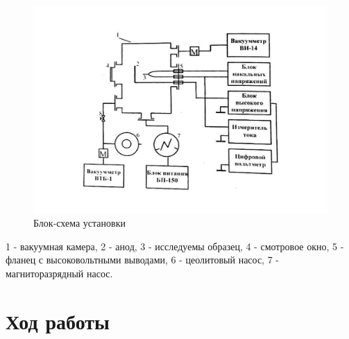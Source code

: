 \documentclass[a4paper]{article}
\begin{document}
\begin{figure}[H]
	\begin{center}
	\includegraphics[scale = 0.35]{p3.pdf}
	\caption{Блок-схема установки}
	\label{default}
	\end{center}
\end{figure}

1 - вакуумная камера, 2 - анод, 3 - исследуемы образец, 4 - смотровое окно, 5 - 
фланец с высоковольтными выводами, 6 - цеолитовый насос, 7 - магниторазрядный насос.

\section{Ход работы}
\end{document}
